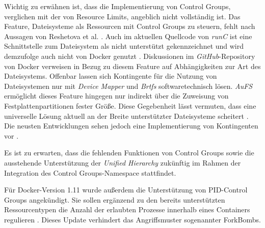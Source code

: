 \documentclass[../main.tex]{subfiles}
\begin{document}
		Wichtig zu erwähnen ist, dass die Implementierung von Control Groups, verglichen mit der von Resource Limits, angeblich nicht vollständig ist. Das Feature, Dateisysteme als Ressourcen mit Control Groups zu steuern, fehlt nach Aussagen von Reshetova et al. \cite[S.19]{dockerSec2}. Auch im aktuellen Quellcode von \emph{runC} ist eine Schnittstelle zum Dateisystem als \glqq{}nicht unterstützt\grqq{} gekennzeichnet und wird demzufolge auch nicht von Docker genutzt \cite{githubRunCCgroups}. Diskussionen im \emph{GitHub}-Repository von Docker verweisen in Bezug zu diesem Feature auf Abhängigkeiten zur Art des Dateisystems. Offenbar lassen sich Kontingente für die Nutzung von Dateisystemen nur mit \emph{Device Mapper} und \emph{Brtfs} softwaretechnisch lösen. \emph{AuFS} ermöglicht dieses Feature hingegen nur indirekt über die Zuweisung von Festplattenpartitionen fester Größe. Diese Gegebenheit lässt vermuten, dass eine universelle Lösung aktuell an der Breite unterstützter Dateisysteme scheitert \cite{githubDockerIssueFsQuota}. Die neusten Entwicklungen sehen jedoch eine Implementierung von Kontingenten vor \cite{githubDockerPullBrtfs}.

		Es ist zu erwarten, dass die fehlenden Funktionen von Control Groups sowie die ausstehende Unterstützung der \emph{Unified Hierarchy} zukünftig im Rahmen der Integration des Control Groups-Namespace stattfindet.

		\clearpage

		Für Docker-Version 1.11 wurde außerdem die Unterstützung von \acrshort{PID}-Control Groups angekündigt. Sie sollen ergänzend zu den bereits unterstützten Ressourcentypen die Anzahl der erlaubten Prozesse innerhalb eines Containers regulieren \cite{githubCgroupPID}\cite{docker110Security}. Dieses Update verhindert das Angriffsmuster sogenannter \glspl{ForkBomb}.


\end{document}

